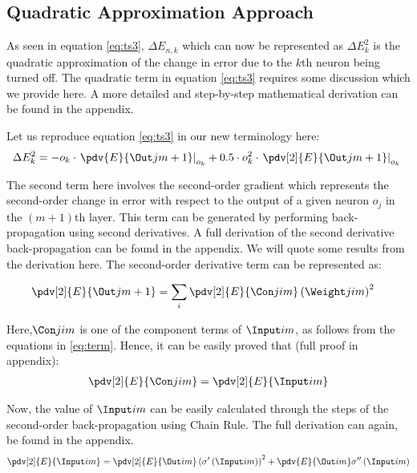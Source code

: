 \subsection{Quadratic Approximation Approach}

As seen in equation \ref{eq:ts3}, $\Delta E_{n,k}$ which can now be represented as $\Delta E_{k}^2$ is the quadratic approximation of the change in error due to the $k$th neuron being turned off. The quadratic term in equation \ref{eq:ts3} requires some discussion which we provide here. A more detailed and step-by-step mathematical derivation can be found in the appendix.

Let us reproduce equation \ref{eq:ts3} in our new terminology here: 
\begin{align}
\Delta E_{k}^2 = - o_k\cdot \left.\pdv{E}{{\Out j {m+1}}}\right|_{o_k} + 0.5\cdot o_k^2\cdot \left.\pdv[2]{E}{{\Out j {m+1}}}\right|_{o_k}\
\end{align}

The second term here involves the second-order gradient which represents the second-order change in error with respect to the output of a given neuron $o_j$ in the $(m+1)$th layer. This term can be generated by performing back-propagation using second derivatives. A full derivation of the second derivative back-propagation can be found in the appendix. We will quote some results from the derivation here. The second-order derivative term can be represented as:

\begin{align}
\pdv[2]{E}{{\Out j {m+1}}} &= \sum_i
\pdv[2]{E}{{\Con j i m}} \left({\Weight j i m}\right)^2
\end{align} 

Here,$\Con j i m$ is one of the component terms of $\Input i m$, as follows from the equations in \ref{eq:term}. Hence, it can be easily proved that (full proof in appendix):
\begin{align}
\pdv[2]{E}{{\Con j i m}} = \pdv[2]{E}{{\Input i m}}
\end{align}

Now, the value of $\Input i m$ can be easily calculated through the steps of the second-order back-propagation using Chain Rule. The full derivation can again, be found in the appendix.
\begin{align}
\pdv[2]{E}{{\Input i m}}=\pdv[2]{E}{{\Out i m}} \left(\sigma^{\prime}\left({\Input i m}\right)\right)^2
+
\pdv{E}{{\Out i m}}\sigma^{\prime\prime}\left(\Input i m\right)
\end{align}
